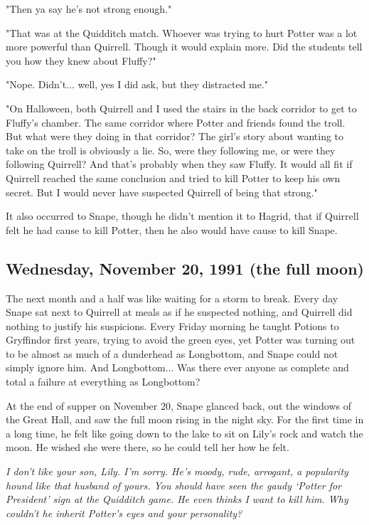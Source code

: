 "Then ya say he's not strong enough."

"That was at the Quidditch match. Whoever was trying to hurt Potter was a lot more powerful than Quirrell. Though it would explain more. Did the students tell you how they knew about Fluffy?"

"Nope. Didn't... well, yes I did ask, but they distracted me."

"On Halloween, both Quirrell and I used the stairs in the back corridor to get to Fluffy's chamber. The same corridor where Potter and friends found the troll. But what were they doing in that corridor? The girl's story about wanting to take on the troll is obviously a lie. So, were they following me, or were they following Quirrell? And that's probably when they saw Fluffy. It would all fit if Quirrell reached the same conclusion and tried to kill Potter to keep his own secret. But I would never have suspected Quirrell of being that strong."

It also occurred to Snape, though he didn't mention it to Hagrid, that if Quirrell felt he had cause to kill Potter, then he also would have cause to kill Snape.

\subsection{Wednesday, November 20, 1991 (the full moon)}

The next month and a half was like waiting for a storm to break. Every day Snape sat next to Quirrell at meals as if he suspected nothing, and Quirrell did nothing to justify his suspicions. Every Friday morning he taught Potions to Gryffindor first years, trying to avoid the green eyes, yet Potter was turning out to be almost as much of a dunderhead as Longbottom, and Snape could not simply ignore him. And Longbottom... Was there ever anyone as complete and total a failure at everything as Longbottom?

At the end of supper on November 20, Snape glanced back, out the windows of the Great Hall, and saw the full moon rising in the night sky. For the first time in a long time, he felt like going down to the lake to sit on Lily's rock and watch the moon. He wished she were there, so he could tell her how he felt.

\emph{I don't like your son, Lily. I'm sorry. He's moody, rude, arrogant, a popularity hound like that husband of yours. You should have seen the gaudy `Potter for President' sign at the Quidditch game. He even thinks I want to kill him. Why couldn't he inherit Potter's eyes and your personality?}

